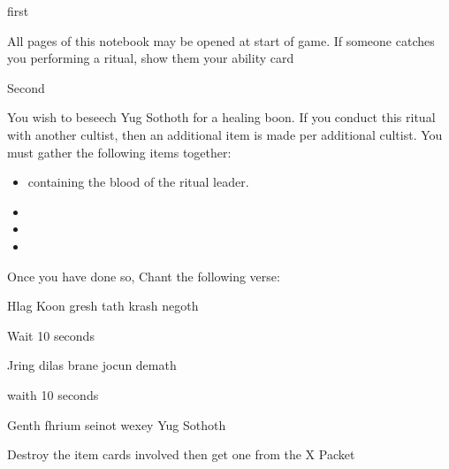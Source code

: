 \documentclass[greennotebook]{guildcamp4} %
\begin{document}
\startnotebook{\nRasputinYog{}}

\begin{page}{first}
	
	All pages of this notebook may be opened at start of game.  If someone catches you performing a ritual, show them your ability card \aRitual{}
	
\end{page}

\begin{page}{Second}
		
		You wish to beseech Yug Sothoth for a healing boon. If you conduct this ritual with another cultist, then an additional item is made per additional cultist. You must gather the following items together: 
		
		\begin{itemize}
			\item \iTestTube{} containing the blood of the ritual leader.
			\item \iSieve{}
			\item \iCauldron{}
			\item \iIsotope{}
		\end{itemize}
	
		Once you have done so, Chant the following verse:
		
		Hlag Koon gresh tath krash negoth
		
		Wait 10 seconds
		
		Jring dilas brane jocun demath
		
		waith 10 seconds
		
		Genth fhrium seinot wexey Yug Sothoth
		
		Destroy the item cards involved then get one \iHealthPotion{} from the X Packet 

	\end{page}
	
\end{document}
